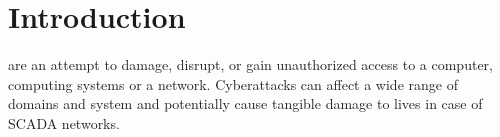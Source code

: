 \documentclass[13pt,journal,compsoc,onecolumn]{IEEEtran}
\begin{document}
%
\IEEEpeerreviewmaketitle



\section{Introduction}
\label{section:intro}
%
%



% 
% 
% 
% 
 are an attempt to damage, disrupt, or gain unauthorized access to a computer, computing systems or a network. Cyberattacks can affect a wide range of domains and system and potentially cause tangible damage to lives in case of SCADA networks.
\end{document}
